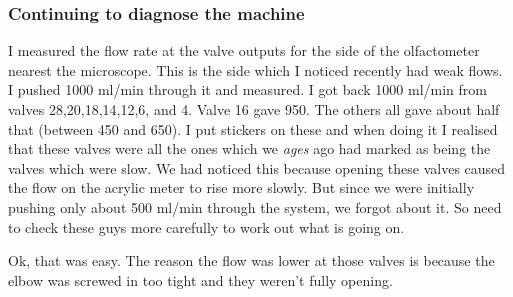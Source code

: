 \documentclass[a4paper]{report}
\begin{document}
\subsubsection{Continuing to diagnose the machine}
I measured the flow rate at the valve outputs for the side of the
olfactometer nearest the microscope. This is the side which I noticed
recently had weak flows. I pushed 1000 ml/min through it and
measured. I got back 1000 ml/min from valves 28,20,18,14,12,6, and
4. Valve 16 gave 950. The others all gave about half that (between 450
and 650). I put stickers on these and when doing it I realised that
these valves were all the ones which we \textit{ages} ago had marked
as being the valves which were slow. We had noticed this because
opening these valves caused the flow on the acrylic meter to rise more
slowly. But since we were initially pushing only about 500 ml/min
through the system, we forgot about it. So need to check these guys
more carefully to work out what is going on. 

Ok, that was easy. The reason the flow was lower at those valves is
because the elbow was screwed in too tight and they weren't fully
opening. 
\end{document}
